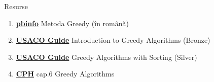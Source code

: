 \documentclass{beamer}
\begin{document}
\begin{frame}{Resurse}
  \begin{enumerate}\itemsep10pt
    \item \href{https://www.pbinfo.ro/articole/16619/metoda-greedy}{\textbf{pbinfo}}
          \textemdash{} Metoda Greedy (în română)
    \item \href{https://usaco.guide/bronze/intro-greedy}{\textbf{USACO Guide}}
          \textemdash{} Introduction to Greedy Algorithms (Bronze)
    \item \href{https://usaco.guide/silver/greedy-sorting}{\textbf{USACO Guide}}
          \textemdash{} Greedy Algorithms with Sorting (Silver)
    \item \href{https://cses.fi/book/book.pdf}{\textbf{CPH}}
          \textemdash{} cap.\@ 6 \textemdash{} Greedy Algorithms
  \end{enumerate}
\end{frame}
\end{document}
